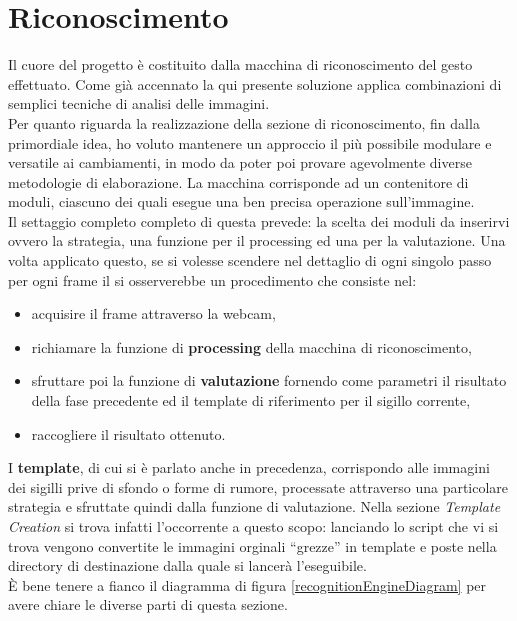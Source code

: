 \documentclass[a4paper,10pt, twocolumn]{article}
\begin{document}
\section{Riconoscimento}
Il cuore del progetto \`{e} costituito dalla macchina di riconoscimento del gesto effettuato.
Come gi\`{a} accennato la qui presente soluzione applica combinazioni di 
semplici tecniche di analisi delle immagini.\\
Per quanto riguarda la realizzazione della sezione di riconoscimento, 
fin dalla primordiale idea, ho voluto mantenere un approccio il pi\`{u} possibile modulare
e versatile ai cambiamenti, in modo da poter poi provare agevolmente diverse metodologie
di elaborazione. La macchina corrisponde ad un contenitore di moduli, ciascuno 
dei quali esegue una ben precisa operazione sull'immagine.\\
Il settaggio completo completo di questa prevede: la scelta dei moduli
da inserirvi ovvero la strategia, una funzione per il processing ed una per la 
valutazione.
Una volta applicato questo, se si volesse scendere
nel dettaglio di ogni singolo passo per 
ogni frame il si osserverebbe un procedimento che consiste nel:
\begin{itemize}
 \item acquisire il frame attraverso la webcam, 
 \item richiamare la funzione di \textbf{processing} della macchina di riconoscimento,
 \item sfruttare poi la funzione di \textbf{valutazione} fornendo come parametri
 il risultato della fase precedente ed il template di riferimento
 per il sigillo corrente,
 \item raccogliere il risultato ottenuto.
\end{itemize}
I \textbf{template}, di cui si \`{e} parlato anche in precedenza,
corrispondo alle immagini dei sigilli prive di sfondo o
forme di rumore, processate attraverso una particolare strategia e sfruttate
quindi dalla funzione di valutazione. Nella sezione \textit{Template Creation} 
si trova infatti l'occorrente a questo scopo: lanciando lo
script che vi si trova vengono convertite le immagini orginali ``grezze'' 
in template e poste nella directory di destinazione dalla quale si lancer\`{a}
l'eseguibile. \\
\`{E} bene tenere a fianco il diagramma di figura \ref{recognitionEngineDiagram} 
per avere chiare le diverse parti di questa sezione.
 
\end{document}
